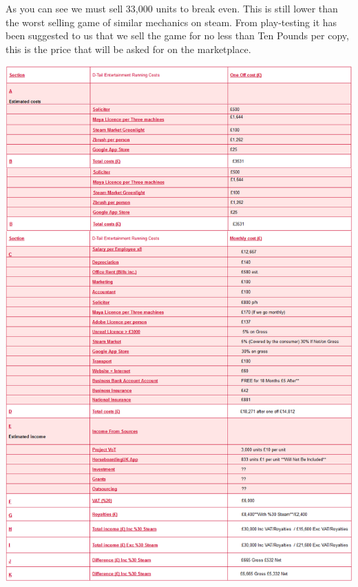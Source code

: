 \documentclass{scrartcl}
\begin{document}
As you can see we must sell 33,000 units to break even. This is still lower than the worst selling game of similar mechanics on steam.
From play-testing it has been suggested to us that we sell the game for no less than Ten Pounds per copy, this is the price that will be asked for on the marketplace.
\newline
\begin{center}
	\includegraphics[scale=0.56]{CostsChartLong}
\end{center}
	
											
	
	
											
\end{document}
